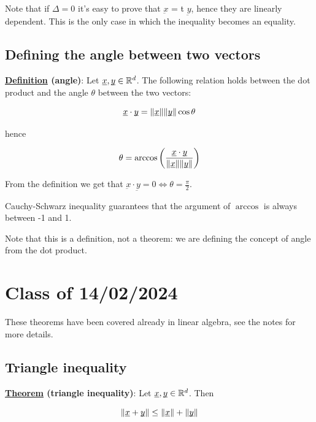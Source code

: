 \documentclass[10pt]{extarticle}
\renewcommand{\vec}[1]{\underbar{\ensuremath{#1}}}
\begin{document}
Note that if $\Delta = 0$ it's easy to prove that $\vec{x}$  = t $\vec{y}$, hence they are linearly dependent. This is the only case in which the inequality becomes an equality.

\subsection{Defining the angle between two vectors}

\textbf{\underline{Definition} (angle)}: Let $\vec{x}, \vec{y} \in \R^d$. The following relation holds between the dot product and the angle $\theta$ between the two vectors:

$$
    \vec{x} \cdot \vec{y} = \norm{\vec{x}} \norm{\vec{y}} \cos \theta
$$

hence

$$
    \theta = \arccos \left( \frac{\vec{x} \cdot \vec{y}}{\norm{\vec{x}} \norm{\vec{y}}} \right)
$$

From the definition we get that $\vec{x} \cdot \vec{y} = 0 \iff \theta = \frac{\pi}{2}$.

Cauchy-Schwarz inequality guarantees that the argument of $\arccos$ is always between -1 and 1.

Note that this is a definition, not a theorem: we are defining the concept of angle from the dot product.

\section{Class of 14/02/2024}

These theorems have been covered already in linear algebra, see the notes for more details.

\subsection{Triangle inequality}

\textbf{\underline{Theorem} (triangle inequality)}: Let $\vec{x}, \vec{y} \in \R^d$. Then

$$
    \norm{\vec{x} + \vec{y}} \leq \norm{\vec{x}} + \norm{\vec{y}}
$$
\end{document}
